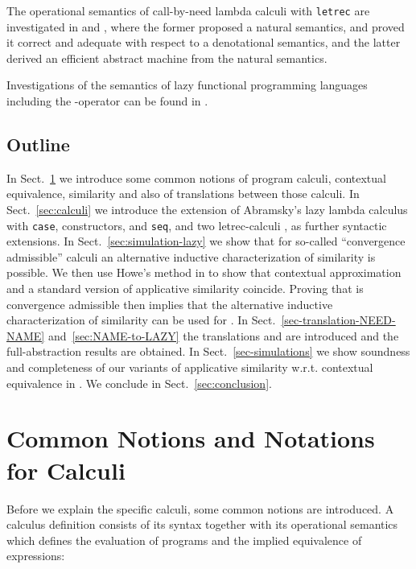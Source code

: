 \documentclass{LMCS}
\theoremstyle{plain}
\theoremstyle{definition}
\newcommand{\tletrec}{{\tt letrec}}
\newcommand{\tcase}{{\tt case}}
\newcommand{\tseq}{{\tt seq}}
\begin{document}
The operational semantics of call-by-need lambda calculi with \tletrec{} are 
investigated in \cite{launch:93} and \cite{sestoft:97}, where the former proposed
a natural semantics, and proved it correct and adequate with respect to a 
denotational semantics, and the latter derived an efficient abstract machine 
from the natural semantics.

Investigations of the semantics of lazy functional programming languages including
the -operator can be found in 
\cite{johann-voigtlaender:06,voigtlaender-johann:07}.

\subsection*{Outline}
In Sect.~\ref{sec:common} we introduce some common notions of program calculi,
contextual equivalence, similarity and also of translations between those 
calculi.
In Sect.~\ref{sec:calculi} we introduce the extension  of Abramsky's
lazy lambda calculus with \tcase, constructors, and \tseq, and two 
letrec-calculi ,  as further syntactic extensions.
In Sect.~\ref{sec:simulation-lazy} we show that for so-called 
``convergence admissible'' calculi an alternative inductive characterization of
similarity is possible. 
We then use Howe's method in  to show that contextual approximation and
a standard version of applicative similarity coincide. 
Proving that  is convergence admissible then implies that the 
alternative inductive characterization of similarity can be used for .
In Sect.~\ref{sec-translation-NEED-NAME} and~\ref{sec:NAME-to-LAZY} the 
translations  and  are introduced and the full-abstraction results are
obtained.
In Sect.~\ref{sec-simulations} we show soundness and completeness of our 
variants of applicative similarity w.r.t. contextual equivalence in .
We conclude in Sect.~\ref{sec:conclusion}.

\section{Common Notions and Notations for Calculi}\label{sec:common}
Before we explain the specific calculi, some common notions are introduced.
A calculus definition consists of its syntax  together with its operational 
semantics which defines the evaluation of programs and the implied equivalence
of expressions: 
\end{document}

